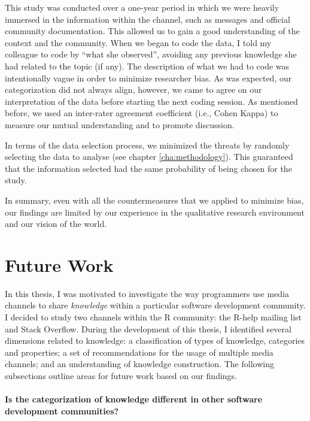\documentclass{sig-alternate-05-2015}
\begin{document}
	This study was conducted over a one-year period in which we were heavily immersed in the information within the channel, such as messages and official community documentation. This allowed us to gain a good understanding of the context and the community. 
	When we began to code the data, I told my colleague to code by ``what she observed'', avoiding any previous knowledge she had related to the topic (if any). 
	The description of what we had to code was intentionally vague in order to minimize researcher bias.
	As was expected, our categorization did not always align, however, 
	we came to agree on our interpretation of the data before starting the next coding session. 
	As mentioned before, we used an inter-rater agreement coefficient (i.e., Cohen Kappa) to measure our mutual understanding and to promote discussion.

	In terms of the data selection process, we minimized the threats by randomly selecting the data to analyse (see chapter \ref{cha:methodology}).
	This guaranteed that the information selected had the same probability of being chosen for the study.

	In summary, even with all the countermeasures that we applied to minimize bias, our findings are limited by our experience in the qualitative research environment and our vision of the world.   


\section{Future Work}
\label{cha:future-work}

	In this thesis, I was motivated to investigate the way programmers use media channels to share \textit{knowledge} within a particular software development community. 
	I decided to study two channels within the R community: the R-help mailing list and Stack Overflow.
	During the development of this thesis, I identified several dimensions related to knowledge: a classification of types of knowledge, categories and properties; a set of recommendations for the usage of multiple media channels; and an understanding of knowledge construction. 
	The following subsections outline areas for future work based on our findings.

	\paragraph{Is the categorization of knowledge different in other software development communities?}
\end{document}
